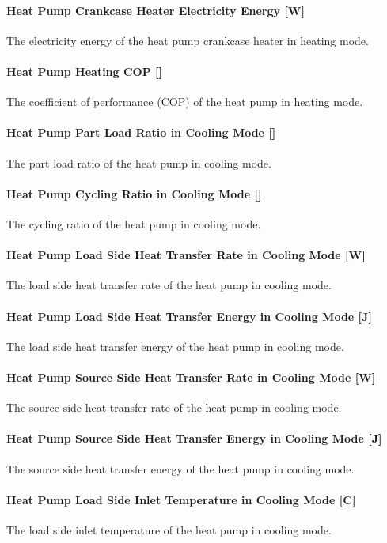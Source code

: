 \paragraph{Heat Pump Crankcase Heater Electricity Energy {[}W{]}} The
electricity energy of the heat pump crankcase heater in heating mode.
\paragraph{Heat Pump Heating COP {[}{]}} The coefficient of performance (COP) of
the heat pump in heating mode.
\paragraph{Heat Pump Part Load Ratio in Cooling Mode {[}{]}} The part load ratio
of the heat pump in cooling mode.
\paragraph{Heat Pump Cycling Ratio in Cooling Mode {[}{]}} The cycling ratio of
the heat pump in cooling mode.
\paragraph{Heat Pump Load Side Heat Transfer Rate in Cooling Mode {[}W{]}} The
load side heat transfer rate of the heat pump in cooling mode.
\paragraph{Heat Pump Load Side Heat Transfer Energy in Cooling Mode {[}J{]}} The
load side heat transfer energy of the heat pump in cooling mode.
\paragraph{Heat Pump Source Side Heat Transfer Rate in Cooling Mode {[}W{]}} The
source side heat transfer rate of the heat pump in cooling mode.
\paragraph{Heat Pump Source Side Heat Transfer Energy in Cooling Mode {[}J{]}}
The source side heat transfer energy of the heat pump in cooling mode.
\paragraph{Heat Pump Load Side Inlet Temperature in Cooling Mode {[}C{]}} The
load side inlet temperature of the heat pump in cooling mode.
